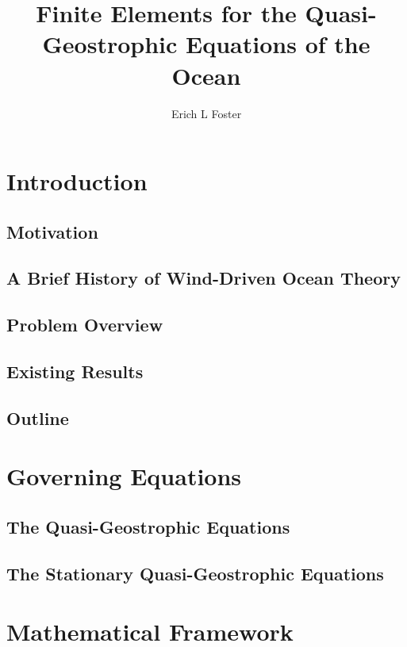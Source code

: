 \documentclass[12pt]{VTthesis}
\title{
  Finite Elements for the Quasi-Geostrophic Equations of the Ocean
}
\author{Erich L Foster}
\begin{document}
  \frontmatter
  \maketitle
  \tableofcontents
  \listoftables
  \listoffigures

  \mainmatter

  \chapter{Introduction} \label{ch:Intro}
    \section{Motivation} \label{sec:Motivation}
    
    \section{A Brief History of Wind-Driven Ocean Theory}
    
    \section{Problem Overview}
    
    \section{Existing Results}
    
    \section{Outline}
    

  \chapter{Governing Equations} \label{ch:Model}
  
    \section{The Quasi-Geostrophic Equations} \label{sec:QGE}
    
    \section{The Stationary Quasi-Geostrophic Equations} \label{sec:SQGE}
    

  \chapter{Mathematical Framework} \label{ch:WellPosed}
  
\end{document}
